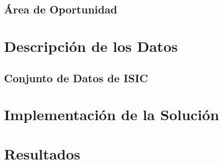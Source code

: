 \section{Área de Oportunidad}

\chapter{Descripción de los Datos}
\section{Conjunto de Datos de ISIC}

\chapter{Implementación de la Solución}

\chapter{Resultados}

